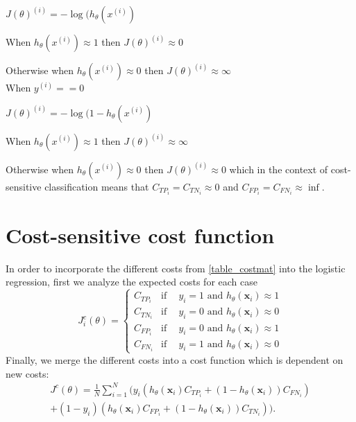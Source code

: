 			\quad $J(\theta)^{(i)}=-\log(h_\theta(x^{(i)})$
			
			\quad When $h_\theta(x^{(i)})\approx1$ then $J(\theta)^{(i)}\approx0$
			
			\quad Otherwise when $h_\theta(x^{(i)})\approx0$ then
			$J(\theta)^{(i)}\approx\infty$ \\

			When $y^{(i)}==0$
			
			\quad $J(\theta)^{(i)}=-\log(1-h_\theta(x^{(i)})$
			
			\quad\quad When $h_\theta(x^{(i)})\approx1$ then
			$J(\theta)^{(i)}\approx\infty$ 

			\quad\quad Otherwise when $h_\theta(x^{(i)})\approx0$ then
			$J(\theta)^{(i)}\approx0$ 
  which in the context of cost-sensitive classification means that $C_{TP_i}=C_{TN_i}\approx 0$ and 
  $C_{FP_i}=C_{FN_i}\approx \inf$.
	
	
\section{Cost-sensitive cost function}
  In order to incorporate the different costs from \tablename{ \ref{table_costmat}} into the 
  logistic regression, first we analyze the expected costs for each case
  \begin{equation*}
    J^c_i(\theta) = 
    \begin{cases}
      C_{TP_i}    & \text{if} \phantom{-}  y_i = 1 \text{ and } h_\theta(\mathbf{x}_i) \approx 1  \\
      C_{TN_i}    & \text{if} \phantom{-}  y_i = 0 \text{ and } h_\theta(\mathbf{x}_i) \approx 0  \\
      C_{FP_i}    & \text{if} \phantom{-}  y_i = 0 \text{ and } h_\theta(\mathbf{x}_i) \approx 1  \\
      C_{FN_i}    & \text{if} \phantom{-}  y_i = 1 \text{ and } h_\theta(\mathbf{x}_i) \approx 0 
    \end{cases}
  \end{equation*}
  Finally, we merge the different costs into a cost function which is dependent on new costs:
  \begin{align}\label{eq:CSLR}
    J^c(\theta)=\frac{1}{N} \sum_{i=1}^{N} \bigg( y_i(h_\theta(\mathbf{x}_i) C_{TP_i} + 
    (1-h_\theta(\mathbf{x}_i))C_{FN_i})  \nonumber\\ 
    +(1-y_i)(h_\theta(\mathbf{x}_i) C_{FP_i} + (1-h_\theta(\mathbf{x}_i))C_{TN_i}) \bigg).
  \end{align}
  
